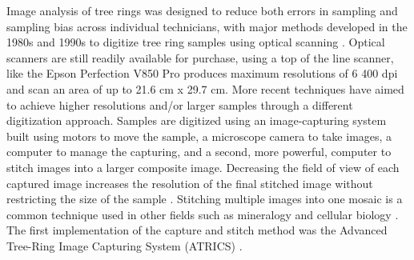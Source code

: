 \documentclass[a4paper,12pt]{article}
\begin{document}
Image analysis of tree rings was designed to reduce both errors in sampling and sampling bias across individual technicians, with major methods developed in the 1980s and 1990s to digitize tree ring samples using optical scanning \citep{mcmillin_application_1982} \citep{guay_new_1992}. Optical scanners are still readily available for purchase, using a top of the line scanner, like the Epson Perfection V850 Pro produces maximum resolutions of 6 400 dpi and scan an area of up to 21.6 cm x 29.7 cm.
More recent techniques have aimed to achieve higher resolutions and/or larger samples through a different digitization approach. Samples are digitized using an image-capturing system built using motors to move the sample, a microscope camera to take images, a computer to manage the capturing, and a second, more powerful, computer to stitch images into a larger composite image.
Decreasing the field of view of each captured image increases the resolution of the final stitched image without restricting the size of the sample \citep{muhlich_stitching_2022}.
Stitching multiple images into one mosaic is a common technique used in other fields such as mineralogy and cellular biology \citep{ro_image_2021,mohammadi_fast_2024}. 
The first implementation of the capture and stitch method was the Advanced Tree-Ring Image Capturing System (ATRICS) \citep{levanic_atrics_2007}. %
\end{document}
